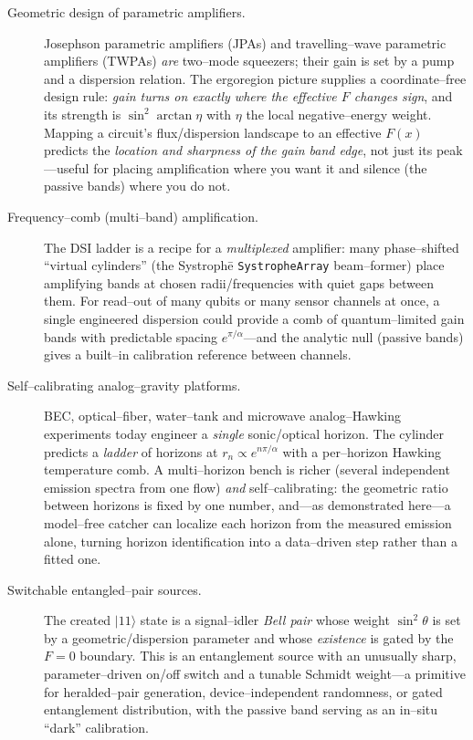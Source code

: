 \documentclass[11pt]{article}
\newcommand{\code}[1]{\texttt{\small #1}}
\begin{document}
\begin{description}
\item[Geometric design of parametric amplifiers.] Josephson parametric amplifiers (JPAs) and
travelling--wave parametric amplifiers (TWPAs) \emph{are} two--mode squeezers; their gain is set
by a pump and a dispersion relation. The ergoregion picture supplies a coordinate--free design
rule: \emph{gain turns on exactly where the effective $F$ changes sign}, and its strength is
$\sin^2\!\arctan\eta$ with $\eta$ the local negative--energy weight. Mapping a circuit's
flux/dispersion landscape to an effective $F(x)$ predicts the \emph{location and sharpness of the
gain band edge}, not just its peak---useful for placing amplification where you want it and
silence (the passive bands) where you do not.

\item[Frequency--comb (multi--band) amplification.] The DSI ladder is a recipe for a
\emph{multiplexed} amplifier: many phase--shifted ``virtual cylinders'' (the Systroph\=e
\code{SystropheArray} beam--former) place amplifying bands at chosen radii/frequencies with quiet
gaps between them. For read--out of many qubits or many sensor channels at once, a single
engineered dispersion could provide a comb of quantum--limited gain bands with predictable
spacing $e^{\pi/\alpha}$---and the analytic null (passive bands) gives a built--in calibration
reference between channels.

\item[Self--calibrating analog--gravity platforms.] BEC, optical--fiber, water--tank and
microwave analog--Hawking experiments today engineer a \emph{single} sonic/optical horizon. The
cylinder predicts a \emph{ladder} of horizons at $r_n\propto e^{n\pi/\alpha}$ with a per--horizon
Hawking temperature comb. A multi--horizon bench is richer (several independent emission spectra
from one flow) \emph{and} self--calibrating: the geometric ratio between horizons is fixed by one
number, and---as demonstrated here---a model--free catcher can localize each horizon from the
measured emission alone, turning horizon identification into a data--driven step rather than a
fitted one.

\item[Switchable entangled--pair sources.] The created $\lvert11\rangle$ state is a signal--idler
\emph{Bell pair} whose weight $\sin^2\theta$ is set by a geometric/dispersion parameter and whose
\emph{existence} is gated by the $F=0$ boundary. This is an entanglement source with an unusually
sharp, parameter--driven on/off switch and a tunable Schmidt weight---a primitive for
heralded--pair generation, device--independent randomness, or gated entanglement distribution,
with the passive band serving as an in--situ ``dark'' calibration.


\end{description}
\end{document}
